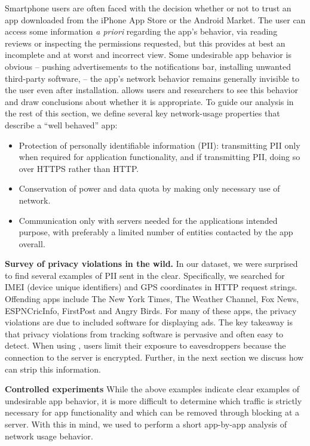     Smartphone users are often faced with the decision whether or not to trust an app downloaded from the iPhone App Store or the Android Market.
    The user can access some information \emph{a priori} regarding the app's behavior, \eg{} via reading reviews or inspecting the permissions requested, but this provides at best an incomplete and at worst and incorrect view.
    Some undesirable app behavior is obvious -- \eg{} pushing advertisements to the notifications bar, installing unwanted third-party software, \etc{} -- the app's network behavior remains generally invisible to the user even after installation. \meddle allows users and researchers to see this behavior and draw conclusions about whether it is appropriate. 
     To guide our analysis in the rest of this section, we define several key network-usage properties that describe a ``well behaved'' app:
    \begin{itemize}
        \item Protection of personally identifiable information (PII): transmitting PII only when required for application functionality, and if transmitting PII, doing so over HTTPS rather than HTTP.
        \item Conservation of power and data quota by making only necessary use of network.
        \item Communication only with servers needed for the applications intended purpose, with preferably a limited number of entities contacted by the app overall.
    \end{itemize}

\noindent\textbf{Survey of privacy violations in the wild.} In our dataset, we were surprised to find several examples of PII sent in the clear. Specifically, we searched for IMEI (device unique identifiers) and 
GPS coordinates in HTTP request strings. Offending apps include The New York Times, The Weather Channel, Fox News, ESPNCricInfo, FirstPost and 
Angry Birds. For many of these apps, the privacy violations are due to included software for displaying ads. The key takeaway is that privacy 
violations from tracking software is pervasive and often easy to detect. When using \meddle, users limit their exposure to eavesdroppers 
because the connection to the \meddle server is encrypted. Further, in the next section we discuss how \meddle can strip this information. 
  
\noindent\textbf{Controlled experiments} While the above examples indicate clear examples of undesirable app behavior, 
it is more difficult to determine which traffic is strictly necessary for app functionality and which can be removed through blocking 
at a \meddle server. 
    With this in mind, we used \meddle to perform a short app-by-app analysis of network usage behavior.
    
